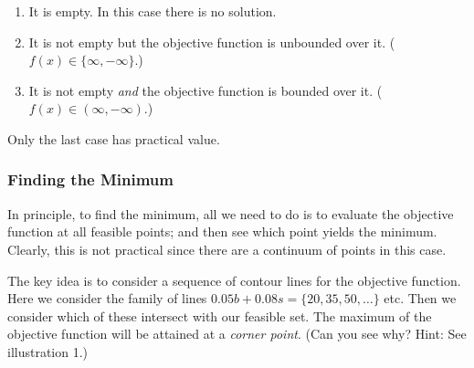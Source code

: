 \documentclass[11pt,]{article}
\providecommand{\tightlist}{%
  \setlength{\itemsep}{0pt}\setlength{\parskip}{0pt}}
\begin{document}
\begin{enumerate}
\def\labelenumi{\arabic{enumi}.}
\tightlist
\item
  It is empty. In this case there is no solution.
\item
  It is not empty but the objective function is unbounded over it.
  (\(f(x)\in\{\infty,-\infty\}\).)
\item
  It is not empty \emph{and} the objective function is bounded over it.
  (\(f(x)\in (\infty,-\infty)\).)
\end{enumerate}

Only the last case has practical value.

\subsubsection{Finding the Minimum}\label{finding-the-minimum}

In principle, to find the minimum, all we need to do is to evaluate the
objective function at all feasible points; and then see which point
yields the minimum. Clearly, this is not practical since there are a
continuum of points in this case.

The key idea is to consider a sequence of contour lines for the
objective function. Here we consider the family of lines
\(0.05b + 0.08s = \{20,35,50,\hdots\}\) etc. Then we consider which of
these intersect with our feasible set. The maximum of the objective
function will be attained at a \emph{corner point}. (Can you see why?
Hint: See illustration 1.)
\end{document}

